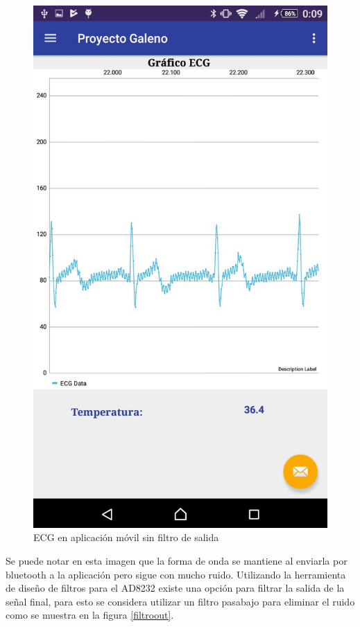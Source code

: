 \begin{figure}[H]
\centering
\includegraphics[scale=0.3]{figuras/ecg/ecgappmalo.jpg}
\caption{ECG en aplicación móvil sin filtro de salida}
\label{ecgfeo}
\end{figure}

Se puede notar en esta imagen que la forma de onda se mantiene al enviarla por bluetooth a la aplicación pero sigue con mucho ruido. Utilizando la herramienta de diseño de filtros para el AD8232 existe una opción para filtrar la salida de la señal final, para esto se considera utilizar un filtro pasabajo para eliminar el ruido como se muestra en la figura \ref{filtroout}.

